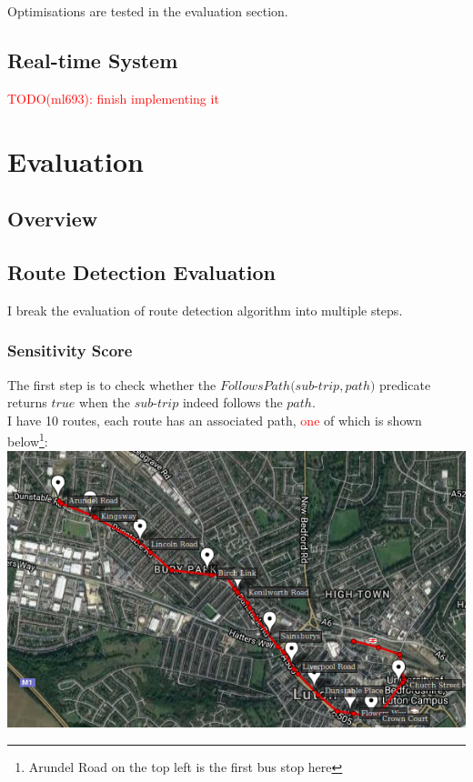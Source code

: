 \documentclass[12pt,a4paper,oneside,openright]{report}
\begin{document}
Optimisations are tested in the evaluation section.



\section{Real-time System}


\textcolor{red}{TODO(ml693): finish implementing it}



\chapter{Evaluation}

\section{Overview}
\newpage

\section{Route Detection Evaluation}

I break the evaluation of route detection algorithm into multiple steps.

\subsection{Sensitivity Score}

The first step is to check whether the 
$FollowsPath(sub$-$trip, path)$ predicate returns $true$ when the $sub$-$trip$
indeed follows the $path$. \\

I have 10 routes, each route has an associated path,
\textcolor{red}{one} of which is shown 
below\footnote{Arundel Road on the top left is the first bus stop here}: \\
\includegraphics[scale = 0.7]{figs/full_route.png} \\
\end{document}
